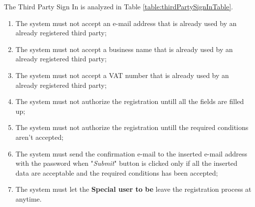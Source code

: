 The Third Party Sign In is analyzed in Table \ref{table:thirdPartySignInTable}.

\begin{enumerate}
  \item The system must not accept an e-mail address that is already used by an already registered third party;
  \item The system must not accept a business name that is already used by an already registered third party;
  \item The system must not accept a VAT number that is already used by an already registered third party;
  \item The system must not authorize the registration untill all the fields are filled up;
  \item The system must not authorize the registration untill the required conditions aren't accepted;
  \item The system must send the confirmation e-mail to the inserted e-mail address with the password when "\textit{Submit}" button is clicked only if all the inserted data are acceptable and the required conditions has been accepted;
  \item The system must let the \textbf{Special user to be} leave the registration process at anytime.
\end{enumerate}

